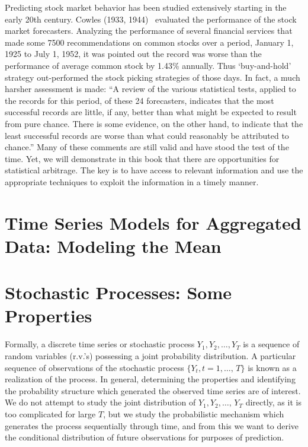 Predicting stock market behavior has been studied extensively starting in the early 20th century. Cowles (1933, 1944)~\cite{cow1,cow2} evaluated the performance of the stock market forecasters. Analyzing the performance of several financial services that made some 7500 recommendations on common stocks over a period, January 1, 1925 to July 1, 1952, it was pointed out the record was worse than the performance of average common stock by 1.43\% annually. Thus `buy-and-hold' strategy out-performed the stock picking strategies of those days. In fact, a much harsher assessment is made: ``A review of the various statistical tests, applied to the records for this period, of these 24 forecasters, indicates that the most successful records are little, if any, better than what might be expected to result from pure chance. There is some evidence, on the other hand, to indicate that the least successful records are worse than what could reasonably be attributed to chance.'' Many of these comments are still valid and have stood the test of the time. Yet, we will demonstrate in this book that there are opportunities for statistical arbitrage. The key is to have access to relevant information and use the appropriate techniques to exploit the information in a timely manner. 



\section{Time Series Models for Aggregated Data: Modeling the Mean \label{sec:modelingthemean}}


\section{Stochastic Processes: Some Properties}

Formally, a discrete time series or stochastic process $Y_1, Y_2, \ldots, Y_T$ is a sequence of random variables (r.v.'s) possessing a joint probability distribution. A particular sequence of observations of the stochastic process $\{ Y_t, t=1, \ldots,  \, T\}$ is known as a realization of the process. In general, determining the properties and identifying the probability structure which generated the observed time series are of interest. We do not attempt to study the joint distribution of $Y_1, Y_2, \ldots, \, Y_T$ directly, as it is too complicated for large $T$, but we study the probabilistic mechanism which generates the process sequentially through time, and from this we want to derive the conditional distribution of future observations for purposes of prediction.


